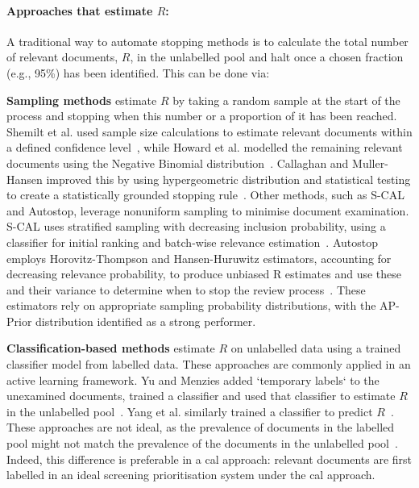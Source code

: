 \documentclass[10pt,oneside]{book}
\begin{document}
\paragraph{Approaches that estimate $R$:} A traditional way to automate stopping methods is to calculate the total number of relevant documents, $R$, in the unlabelled pool and halt once a chosen fraction (e.g., 95\%) has been identified. This can be done via:

\textbf{Sampling methods} estimate $R$ by taking a random sample at the start of the process and stopping when this number or a proportion of it has been reached. Shemilt et al. used sample size calculations to estimate relevant documents within a defined confidence level~\cite{shemilt_pinpointing_2014}, while Howard et al. modelled the remaining relevant documents using the Negative Binomial distribution~\cite{howard_swift-active_2020}. Callaghan and Muller-Hansen improved this by using hypergeometric distribution and statistical testing to create a statistically grounded stopping rule~\cite{callaghan_statistical_2020}. Other methods, such as S-CAL and Autostop, leverage nonuniform sampling to minimise document examination. S-CAL uses stratified sampling with decreasing inclusion probability, using a classifier for initial ranking and batch-wise relevance estimation~\cite{cormack_scalability_2016}. Autostop employs Horovitz-Thompson and Hansen-Huruwitz estimators, accounting for decreasing relevance probability, to produce unbiased R estimates and use these and their variance to determine when to stop the review process~\cite{li_when_2020}. These estimators rely on appropriate sampling probability distributions, with the AP-Prior distribution identified as a strong performer.

\textbf{Classification-based methods} estimate $R$ on unlabelled data using a trained classifier model from labelled data. These approaches are commonly applied in an active learning framework. Yu and Menzies added `temporary labels` to the unexamined documents, trained a classifier and used that classifier to estimate $R$ in the unlabelled pool~\cite{yu_fast2_2019}. Yang et al. similarly trained a classifier to predict $R$~\cite{yang_heuristic_2021}. These approaches are not ideal, as the prevalence of documents in the labelled pool might not match the prevalence of the documents in the unlabelled pool~\cite{del_coz_learning_2021}. Indeed, this difference is preferable in a \gls*{cal} approach: relevant documents are first labelled in an ideal screening prioritisation system under the \gls*{cal} approach. 
\end{document}
